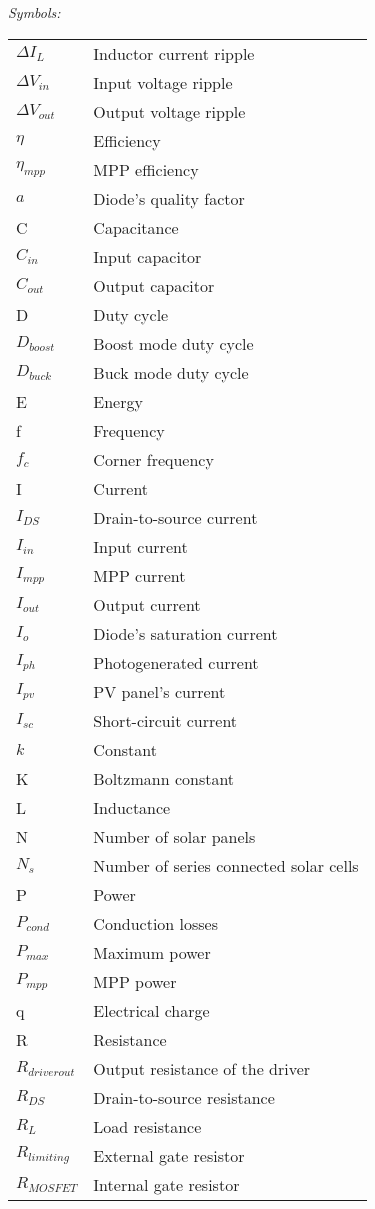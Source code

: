 \vspace{5mm} %
\newpage
\noindent\textit{Symbols:}\newline
\begin{tabular}{ll}
$\Delta I_{L}$ & Inductor current ripple\\
$\Delta V_{in}$ & Input voltage ripple\\
$\Delta V_{out}$ & Output voltage ripple\\
$\eta$ & Efficiency\\
$\eta_{mpp}$ & MPP efficiency\\
$a$ & Diode's quality factor \\
C & Capacitance\\
$C_{in}$ & Input capacitor\\
$C_{out}$ & Output capacitor\\
D & Duty cycle\\
$D_{boost}$ & Boost mode duty cycle\\
$D_{buck}$ & Buck mode duty cycle\\
E & Energy\\
f & Frequency\\
$f_{c}$ & Corner frequency \\
I & Current\\
$I_{DS}$ & Drain-to-source current \\
$I_{in}$ & Input current \\
$I_{mpp}$ & MPP current\\
$I_{out}$ & Output current \\
$I_{o}$ & Diode's saturation current \\
$I_{ph}$ & Photogenerated current \\
$I_{pv}$ & PV panel's current \\
$I_{sc}$ & Short-circuit current\\
$k$ & Constant \\
K & Boltzmann constant \\
L & Inductance\\
N & Number of solar panels \\
$N_{s}$ & Number of series connected solar cells \\
P & Power\\
$P_{cond}$ & Conduction losses \\
$P_{max}$ & Maximum power \\
$P_{mpp}$ & MPP power \\
q & Electrical charge \\
R & Resistance\\
$R_{driver out}$ & Output resistance of the driver\\
$R_{DS}$ & Drain-to-source resistance\\
$R_{L}$ & Load resistance\\
$R_{limiting}$ & External gate resistor\\
$R_{MOSFET}$ & Internal gate resistor\\
\end{tabular}
\newpage

